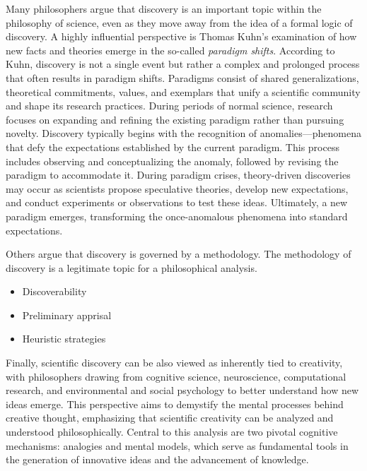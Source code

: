 Many philosophers argue that discovery is an important topic within the philosophy of science, even as they move away from the idea of a formal logic of discovery. A highly influential perspective is Thomas Kuhn's examination of how new facts and theories emerge in the so-called \emph{paradigm shifts}. According to Kuhn, discovery is not a single event but rather a complex and prolonged process that often results in paradigm shifts. Paradigms consist of shared generalizations, theoretical commitments, values, and exemplars that unify a scientific community and shape its research practices. During periods of normal science, research focuses on expanding and refining the existing paradigm rather than pursuing novelty. Discovery typically begins with the recognition of anomalies—phenomena that defy the expectations established by the current paradigm. This process includes observing and conceptualizing the anomaly, followed by revising the paradigm to accommodate it. During paradigm crises, theory-driven discoveries may occur as scientists propose speculative theories, develop new expectations, and conduct experiments or observations to test these ideas. Ultimately, a new paradigm emerges, transforming the once-anomalous phenomena into standard expectations.

{\color{red} Others argue that discovery is governed by a methodology. The methodology of discovery is a legitimate topic for a philosophical analysis.}

\begin{itemize}

\item Discoverability

\item Preliminary apprisal

\item Heuristic strategies

\end{itemize}

Finally, scientific discovery can be also viewed as inherently tied to creativity, with philosophers drawing from cognitive science, neuroscience, computational research, and environmental and social psychology to better understand how new ideas emerge. This perspective aims to demystify the mental processes behind creative thought, emphasizing that scientific creativity can be analyzed and understood philosophically. Central to this analysis are two pivotal cognitive mechanisms: analogies and mental models, which serve as fundamental tools in the generation of innovative ideas and the advancement of knowledge.

